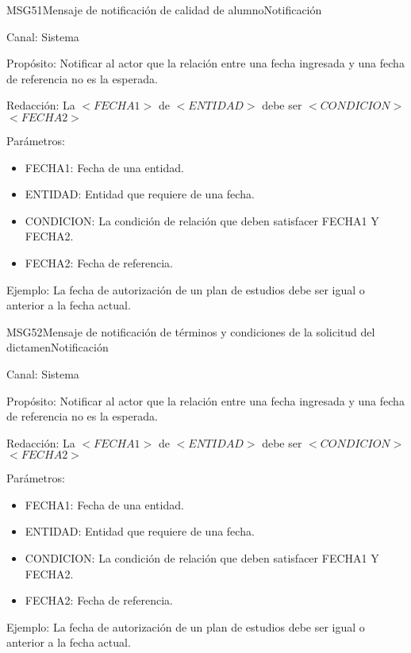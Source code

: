 \begin{mensaje}{MSG51}{Mensaje de notificación de calidad de alumno}{Notificación}
	\item[Canal:] Sistema
	\item[Propósito:] Notificar al actor que la relación entre una fecha ingresada y una fecha de referencia no es la esperada.
	\item[Redacción:] La $<FECHA1>$ de $<ENTIDAD>$ debe ser $<CONDICION>$ $<FECHA2>$
	\item[Parámetros:] 
	\begin{itemize}
		\item FECHA1: Fecha de una entidad.
		\item ENTIDAD: Entidad que requiere de una fecha.
		\item CONDICION: La condición de relación que deben satisfacer FECHA1 Y FECHA2.
		\item FECHA2: Fecha de referencia.
	\end{itemize}
	\item[Ejemplo:] La fecha de autorización de un plan de estudios debe ser igual o anterior a la fecha actual.
	
\end{mensaje}

\begin{mensaje}{MSG52}{Mensaje de notificación de términos y condiciones de la solicitud del dictamen}{Notificación}
	\item[Canal:] Sistema
	\item[Propósito:] Notificar al actor que la relación entre una fecha ingresada y una fecha de referencia no es la esperada.
	\item[Redacción:] La $<FECHA1>$ de $<ENTIDAD>$ debe ser $<CONDICION>$ $<FECHA2>$
	\item[Parámetros:] 
	\begin{itemize}
		\item FECHA1: Fecha de una entidad.
		\item ENTIDAD: Entidad que requiere de una fecha.
		\item CONDICION: La condición de relación que deben satisfacer FECHA1 Y FECHA2.
		\item FECHA2: Fecha de referencia.
	\end{itemize}
	\item[Ejemplo:] La fecha de autorización de un plan de estudios debe ser igual o anterior a la fecha actual.
	
\end{mensaje}


